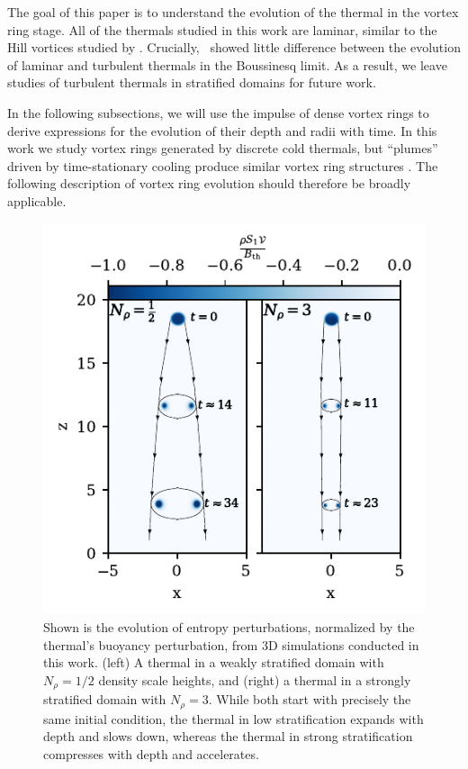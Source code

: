 The goal of this paper is to understand the evolution of the thermal in the vortex ring stage.
All of the thermals studied in this work are laminar, similar to the Hill vortices studied by \citet{brandenburg2016}.
Crucially, \LJ\, showed little difference between the evolution of laminar and turbulent thermals in the Boussinesq limit.
As a result, we leave studies of turbulent thermals in stratified domains for future work.

In the following subsections, we will use the impulse of dense vortex rings to derive expressions for the evolution of their depth and radii with time.
In this work we study vortex rings generated by discrete cold thermals, but ``plumes'' driven by time-stationary cooling produce similar vortex ring structures \cite[as in e.g.,][]{rast1998}.
The following description of vortex ring evolution should therefore be broadly applicable.

\begin{figure}[p!]
    \includegraphics[width=\columnwidth]{./figs/evolution_colormeshes.pdf}
    \caption[Pictoral description of the evolution of thermals as density stratification increases]
	{
	Shown is the evolution of entropy perturbations, normalized by the thermal's buoyancy perturbation, from 3D simulations conducted in this work.
	(left) A thermal in a weakly stratified domain with $N_\rho = 1/2$ density scale heights, and (right) a thermal in a strongly stratified domain with $N_\rho = 3$.
	While both start with precisely the same initial condition, the thermal in low stratification expands with depth and slows down, whereas the thermal in strong stratification compresses with depth and accelerates.
    \label{fig:evolution_colormeshes} }
\end{figure}


